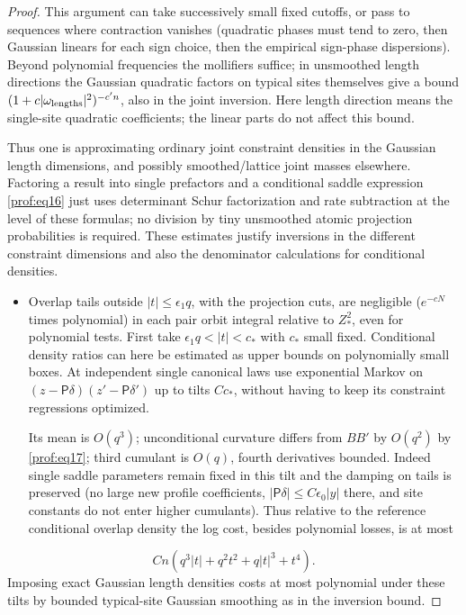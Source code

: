 \begin{proof}
This argument can take successively small fixed cutoffs, or pass to sequences where contraction vanishes (quadratic phases must tend to zero, then Gaussian linears for each sign choice, then the empirical sign-phase dispersions). Beyond polynomial frequencies the mollifiers suffice; in unsmoothed length directions the Gaussian quadratic factors on typical sites themselves give a bound \((1+c|\omega_{\rm lengths}|^2)^{-c'n}\), also in the joint inversion. Here length direction means the single-site quadratic coefficients; the linear parts do not affect this bound.

Thus one is approximating ordinary joint constraint densities in the Gaussian length dimensions, and possibly smoothed/lattice joint masses elsewhere. Factoring a result into single prefactors and a conditional saddle expression \eqref{prof:eq16} just uses determinant Schur factorization and rate subtraction at the level of these formulas; no division by tiny unsmoothed atomic projection probabilities is required. These estimates justify inversions in the different constraint dimensions and also the denominator calculations for conditional densities.

\begin{itemize}
\item Overlap tails outside \(|t|\le\epsilon_1 q\), with the projection cuts, are negligible (\(e^{-cN}\) times polynomial) in each pair orbit integral relative to \(Z_*^2\), even for polynomial tests. First take \(\epsilon_1 q<|t|<c_*\) with \(c_*\) small fixed. Conditional density ratios can here be estimated as upper bounds on polynomially small boxes. At independent single canonical laws use exponential Markov on \((z-\mathsf P\delta)(z'-\mathsf P\delta')\) up to tilts \(C c_*\), without having to keep its constraint regressions optimized.

Its mean is \(O(q^3)\); unconditional curvature differs from \(B B'\) by \(O(q^2)\) by \eqref{prof:eq17}; third cumulant is \(O(q)\), fourth derivatives bounded. Indeed single saddle parameters remain fixed in this tilt and the damping on tails is preserved (no large new profile coefficients, \(|\mathsf P\delta|\le C\epsilon_0 |y|\) there, and site constants do not enter higher cumulants). Thus relative to the reference conditional overlap density the log cost, besides polynomial losses, is at most
\end{itemize}
\[
 C n(q^3|t|+q^2t^2+q|t|^3+t^4).
\]
Imposing exact Gaussian length densities costs at most polynomial under these tilts by bounded typical-site Gaussian smoothing as in the inversion bound.


\end{proof}
